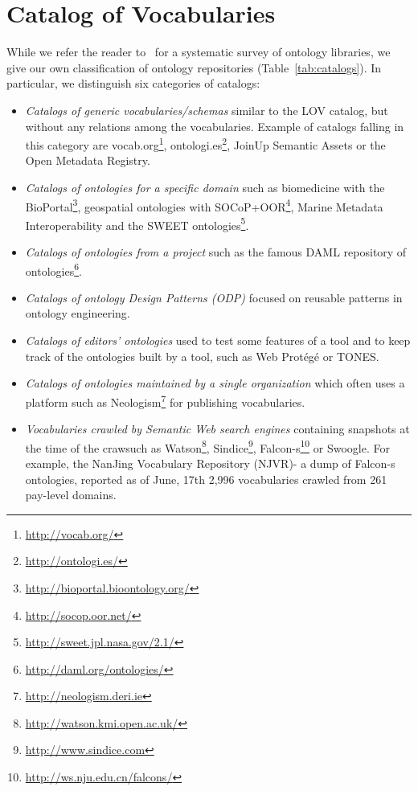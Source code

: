 \section{Catalog of Vocabularies}
\label{sec:catalog}
While we refer the reader to~\cite{AquinJoWS12} for a systematic survey of ontology libraries, we give our own classification of ontology repositories (Table~\ref{tab:catalogs}). In particular, we distinguish six categories of catalogs:
\begin{itemize}
 \item \textit{Catalogs of generic vocabularies/schemas} similar to the LOV catalog, but without any relations among the vocabularies. Example of catalogs falling in this category are vocab.org\footnote{\url{http://vocab.org/}}, ontologi.es\footnote{\url{http://ontologi.es/}}, JoinUp Semantic Assets or the Open Metadata Registry.
 \item \textit{Catalogs of ontologies for a specific domain} such as biomedicine with the BioPortal\footnote{\url{http://bioportal.bioontology.org/}}, geospatial ontologies with SOCoP+OOR\footnote{\url{http://socop.oor.net/}}, Marine Metadata Interoperability and the SWEET ontologies\footnote{\url{http://sweet.jpl.nasa.gov/2.1/}}.
 \item \textit{Catalogs of ontologies from a project} such as the famous DAML repository of ontologies\footnote{\url{http://daml.org/ontologies/}}.
 \item \textit{Catalogs of ontology Design Patterns (ODP)} focused on reusable patterns in ontology engineering.
 \item \textit{Catalogs of editors' ontologies} used to test some features of a tool and to keep track of the ontologies built by a tool, such as Web Prot\'{e}g\'{e} or TONES.
 \item \textit{Catalogs of ontologies maintained by a single organization} which often uses a platform such as Neologism\footnote{\url{http://neologism.deri.ie}} for publishing vocabularies.
 \item \textit{Vocabularies crawled by Semantic Web search engines} containing snapshots at the time of the crawsuch as Watson\footnote{\url{http://watson.kmi.open.ac.uk/}}, Sindice\footnote{\url{http://www.sindice.com}}, Falcon-s\footnote{\url{http://ws.nju.edu.cn/falcons/}} or Swoogle. For example, the NanJing Vocabulary Repository (NJVR)- a dump of Falcon-s ontologies, reported as of June, 17th 2,996 vocabularies crawled from 261 pay-level domains.
\end{itemize}

